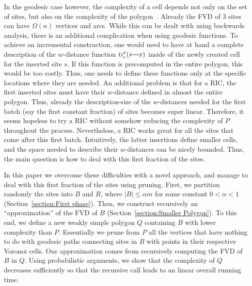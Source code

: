 \documentclass[a4paper,UKenglish]{socg-lipics-v2018}
\newcommand{\dd}[3][P]{\ensuremath{\textsc{d}_{\scriptscriptstyle w}^{\scriptscriptstyle #1}(#2 {\leadsto} #3)}}
\begin{document}
In the geodesic case however, the complexity of a cell depends not only on the set of sites, but also on the complexity of the polygon~\cite{aronov1989geodesic}. 
Already the FVD of 3 sites can have $\Omega(n)$ vertices and arcs.
While this can be dealt with using backwards analysis, there is an additional complication when using geodesic functions.
To achieve an incremental construction, one would need to have at hand a complete description of the $w$-distance function $\dd{s}{x}$ inside of the newly created cell for the inserted site $s$.
If this function is precomputed in the entire polygon, this would be too costly. 
Thus, one needs to define these functions only at the specific locations where they are needed. 
An additional problem is that for a RIC, the first inserted sites must have their $w$-distance defined in almost the entire polygon.
Thus, already the description-size of the $w$-distances needed for the first batch (say the first constant fraction) of sites becomes super linear. 
Therefore, it seems hopeless to try a RIC without somehow reducing the complexity of $P$ throughout the process. 
Nevertheless, a RIC works great for all the sites that come after this first batch. 
Intuitively,  the latter insertions define smaller cells, and the space needed to describe their $w$-distances can be nicely bounded.
Thus, the main question is how to deal with this first fraction of the sites.

In this paper we overcome these difficulties with a novel approach, and manage to deal with this first fraction of the sites using pruning.
First, we partition randomly the sites into $B$ and $R$, where $|B| \leq \alpha m$ for some constant $0 < \alpha < 1$ (Section~\ref{section:First phase}).
Then, we construct recursively an ``approximation'' of the FVD of $B$ (Section~\ref{section:Smaller Polygon}). 
To this end, we define a new weakly simple polygon $Q$ containing $B$ with lower complexity than $P$. 
Essentially we prune from $P$ all the vertices that have nothing to do with geodesic paths connecting sites in $B$ with points in their respective Voronoi cells. 
Our approximation comes from recursively computing the FVD of $B$ in $Q$. 
Using probabilistic arguments, we show that the complexity of $Q$ decreases sufficiently so that the recursive call leads to an linear overall running time.
\end{document}
